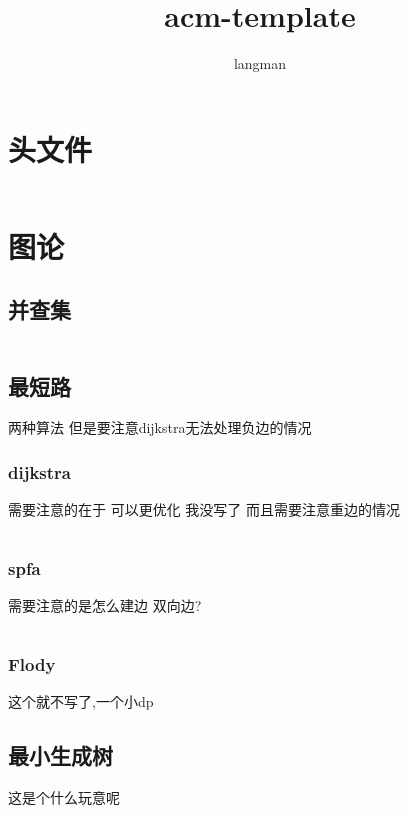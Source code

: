 \documentclass[a4paper,11pt]{article}
\author{langman}
\title{acm-template}
\begin{document}
\maketitle
\begin{CJK}{UTF8}{gbsn}
\section{头文件}

\inputminted{c++}{../scoure/head.cpp}
\newpage
\section{图论}
\subsection{并查集}
\inputminted{c++}{../scoure/Graph_theory/bingchick.cpp}

\subsection{最短路}
两种算法 但是要注意dijkstra无法处理负边的情况
\subsubsection{dijkstra}
需要注意的在于 可以更优化 我没写了 而且需要注意重边的情况
\inputminted{c++}{../scoure/Graph_theory/dijkstra.cpp}
\subsubsection{spfa}
需要注意的是怎么建边 双向边?
\inputminted{c++}{../scoure/Graph_theory/spfa.cpp}
\subsubsection{Flody}
这个就不写了,一个小dp

\subsection{最小生成树}
这是个什么玩意呢


\end{CJK}
\end{document}
